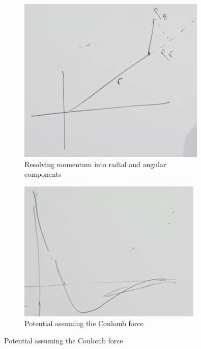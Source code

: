 \documentclass[]{article}
\begin{document}
\begin{figure}[H]
	\caption{Central Force as  a one dimensional problem}
	\begin{subfigure}[t]{0.3\textwidth}
		\caption{Resolving momentum into radial and angular components}\label{fig:aqm-3-1-momentum}
		\includegraphics[width=\textwidth]{aqm-3-1-momentum}
	\end{subfigure}
	\quad
	\begin{subfigure}[t]{0.3\textwidth}
		\caption{Potential assuming the Coulomb force}\label{fig:aqm-3-central}
		\includegraphics[width=\textwidth]{aqm-3-central}

\end{subfigure}
\end{figure}
\end{document}

